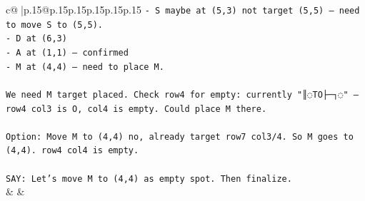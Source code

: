 \documentclass{article}
\begin{document}
{\begin{supertabular}{c@{$\;$}|p{.15\linewidth}@{}p{.15\linewidth}p{.15\linewidth}p{.15\linewidth}p{.15\linewidth}p{.15\linewidth}}
{{{\texttt{{-} S maybe at (5,3) not target (5,5) — need to move S to (5,5).} \\
\texttt{{-} D at (6,3)} \\
\texttt{{-} A at (1,1) — confirmed} \\
\texttt{{-} M at (4,4) — need to place M.} \\
\\ 
\texttt{We need M target placed. Check row4 for empty: currently "║◌TO├─┐◌" — row4 col3 is O, col4 is empty. Could place M there.} \\
\\ 
\texttt{Option: Move M to (4,4) no, already target row7 col3/4. So M goes to (4,4). row4 col4 is empty.} \\
\\ 
\texttt{SAY: Let's move M to (4,4) as empty spot. Then finalize.} \\
            }
        }
    }
    & & \\ \\


\end{supertabular}}
\end{document}
